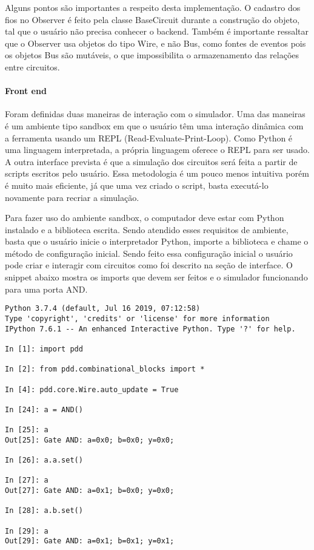 Alguns pontos são importantes a respeito desta implementação.
O cadastro dos fios no Observer é feito pela classe BaseCircuit durante a construção do objeto, tal que o usuário não precisa conhecer o backend.
Também é importante ressaltar que o Observer usa objetos do tipo Wire, e não Bus, como fontes de eventos pois os objetos Bus são mutáveis, o que impossibilita o armazenamento das relações entre circuitos.

\paragraph{Front end}
Foram definidas duas maneiras de interação com o simulador.
Uma das maneiras é um ambiente tipo sandbox em que o usuário têm uma interação dinâmica com a ferramenta usando um REPL (Read-Evaluate-Print-Loop).
Como Python é uma linguagem interpretada, a própria linguagem oferece o REPL para ser usado.
A outra interface prevista é que a simulação dos circuitos será feita a partir de scripts escritos pelo usuário.
Essa metodologia é um pouco menos intuitiva porém é muito mais eficiente, já que uma vez criado o script, basta executá-lo novamente para recriar a simulação.

Para fazer uso do ambiente sandbox, o computador deve estar com Python instalado e a biblioteca escrita.
Sendo atendido esses requisitos de ambiente, basta que o usuário inicie o interpretador Python, importe a biblioteca e chame o método de configuração inicial.
Sendo feito essa configuração inicial o usuário pode criar e interagir com circuitos como foi descrito na seção de interface.
O snippet abaixo mostra os imports que devem ser feitos e o simulador funcionando para uma porta AND.

\begin{lstlisting}
Python 3.7.4 (default, Jul 16 2019, 07:12:58) 
Type 'copyright', 'credits' or 'license' for more information
IPython 7.6.1 -- An enhanced Interactive Python. Type '?' for help.

In [1]: import pdd

In [2]: from pdd.combinational_blocks import *

In [4]: pdd.core.Wire.auto_update = True

In [24]: a = AND()

In [25]: a
Out[25]: Gate AND: a=0x0; b=0x0; y=0x0; 

In [26]: a.a.set()

In [27]: a
Out[27]: Gate AND: a=0x1; b=0x0; y=0x0; 

In [28]: a.b.set()

In [29]: a
Out[29]: Gate AND: a=0x1; b=0x1; y=0x1; 
\end{lstlisting}

